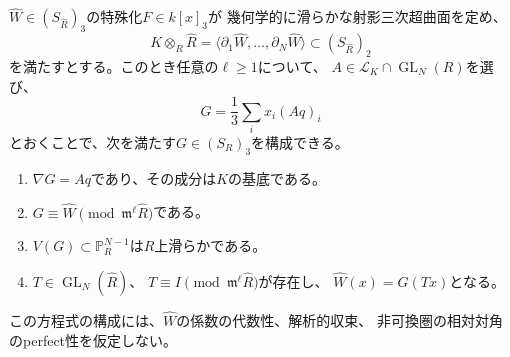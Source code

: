 \begin{theorem}[勾配空間からの局所代数化]\label{far:thm:algebraization}
$\widehat W\in (S_{\widehat R})_3$の特殊化$F\in k[x]_3$が
幾何学的に滑らかな射影三次超曲面を定め、
\begin{equation}\label{far:eq:formal-gradient}
 K\otimes_R\widehat R
 =\langle\partial_1\widehat W,\ldots,\partial_N\widehat W\rangle
 \subset (S_{\widehat R})_2
\end{equation}
を満たすとする。このとき任意の$\ell\ge1$について、
$A\in\mathcal L_K\cap\operatorname{GL}_N(R)$を選び、
\begin{equation}\label{far:eq:euler}
 G=\frac13\sum_i x_i(Aq)_i
\end{equation}
とおくことで、次を満たす$G\in(S_R)_3$を構成できる。
\begin{enumerate}
\item $\nabla G=Aq$であり、その成分は$K$の基底である。
\item $G\equiv\widehat W\pmod{\mathfrak m^\ell\widehat R}$である。
\item $V(G)\subset\mathbb P^{N-1}_R$は$R$上滑らかである。
\item $T\in\operatorname{GL}_N(\widehat R)$、
$T\equiv I\pmod{\mathfrak m^\ell\widehat R}$が存在し、
$\widehat W(x)=G(Tx)$となる。
\end{enumerate}
この方程式の構成には、$\widehat W$の係数の代数性、解析的収束、
非可換圏の相対対角のperfect性を仮定しない。
\end{theorem}

